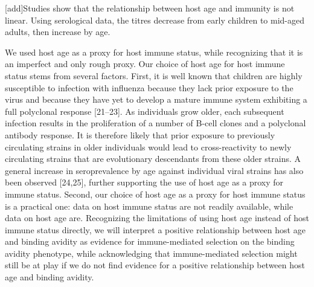 \documentclass{article}
\begin{document}
[add]Studies show that the relationship between host age and immunity is not linear. Using serological data, the titres decrease from early children to mid-aged adults, then increase by age. 


We used host age as a proxy for host immune status, while recognizing that it is an imperfect and only rough proxy. Our choice of host age for host immune status stems from several factors. First, it is well known that children are highly susceptible to infection with influenza because they lack prior exposure to the virus and because they have yet to develop a mature immune system exhibiting a full polyclonal response [21–23]. As individuals grow older, each subsequent infection results in the proliferation of a number of B-cell clones and a polyclonal antibody response. It is therefore likely that prior exposure to previously circulating strains in older individuals would lead to cross-reactivity to newly circulating strains that are evolutionary descendants from these older strains. A general increase in seroprevalence by age against individual viral strains has also been observed [24,25], further supporting the use of host age as a proxy for immune status. Second, our choice of host age as a proxy for host immune status is a practical one: data on host immune status are not readily available, while data on host age are. Recognizing the limitations of using host age instead of host immune status directly, we will interpret a positive relationship between host age and binding avidity as evidence for immune-mediated selection on the binding avidity phenotype, while acknowledging that immune-mediated selection might still be at play if we do not find evidence for a positive relationship between host age and binding avidity. 
\end{document}
